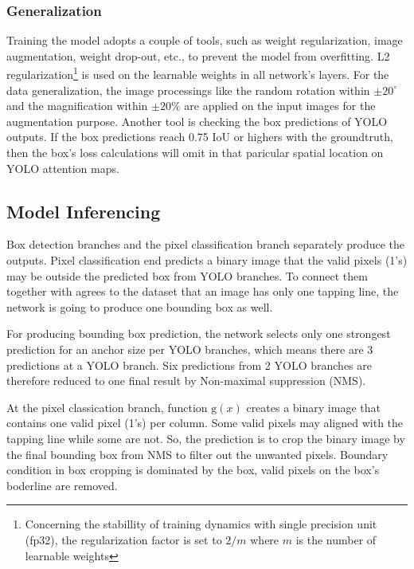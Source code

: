 \documentclass[default,pdflatex,iicol]{sn-jnl}%
\begin{document}
\subsubsection{Generalization}
Training the model adopts a couple of tools, such as weight regularization, image augmentation, weight drop-out, etc., to prevent the model from overfitting. L2 regularization\footnote[2]{Concerning the stabillity of training dynamics with single precision unit (fp32), the regularization factor is set to $2/m$ where $m$ is the number of learnable weights} is used on the learnable weights in all network's layers. For the data generalization, the image processings like the random rotation within $\pm20^\circ$ and the magnification within $\pm20\%$ are applied on the input images for the augmentation purpose. Another tool is checking the box predictions of YOLO outputs. If the box predictions reach 0.75 IoU or highers with the groundtruth, then the box's loss calculations will omit in that paricular spatial location on YOLO attention maps.

\subsection{Model Inferencing}
Box detection branches and the pixel classification branch separately produce the outputs. Pixel classification end predicts a binary image that the valid pixels (1's) may be outside the predicted box from YOLO branches. To connect them together with agrees to the dataset that an image has only one tapping line, the network is going to produce one bounding box as well.

For producing bounding box prediction, the network selects only one strongest prediction for an anchor size per YOLO branches, which means there are 3 predictions at a YOLO branch. Six predictions from 2 YOLO branches are therefore reduced to one final result by Non-maximal suppression (NMS).

At the pixel classication branch, function $\mathrm{g}(x)$ creates a binary image that contains one valid pixel (1's) per column. Some valid pixels may aligned with the tapping line while some are not. So, the prediction is to crop the binary image by the final bounding box from NMS to filter out the unwanted pixels. Boundary condition in box cropping is dominated by the box, valid pixels on the box's boderline are removed.
\end{document}
